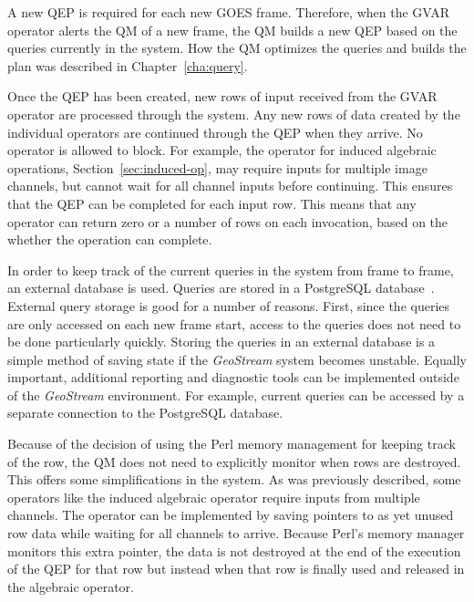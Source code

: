 \documentclass{ucdthesis}       %
\begin{document}
%  

A new \ac{QEP} is required for each new \ac{GOES} frame.  Therefore,
when the \ac{GVAR} operator alerts the \ac{QM} of a new frame, the
\ac{QM} builds a new \ac{QEP} based on the queries currently in the
system.  How the \ac{QM} optimizes the queries and builds the plan was
described in Chapter~\ref{cha:query}.

Once the \ac{QEP} has been created, new rows of input received from
the \ac{GVAR} operator are processed through the system.  Any new rows
of data created by the individual operators are continued through the
\ac{QEP} when they arrive.  No operator is allowed to block.  For
example, the operator for induced algebraic operations,
Section~\ref{sec:induced-op}, may require inputs for multiple image
channels, but cannot wait for all channel inputs before continuing.
This ensures that the \ac{QEP} can be completed for each input row.
This means that any operator can return zero or a number of rows on
each invocation, based on the whether the operation can complete.

In order to keep track of the current queries in the system from frame
to frame, an external database is used.  Queries are stored in a
PostgreSQL database~\cite{05postg}.  External query storage is
good for a number of reasons.  First, since the queries are only
accessed on each new frame start, access to the queries does not need
to be done particularly quickly.  Storing the queries in an external
database is a simple method of saving state if the \emph{GeoStream}
system becomes unstable.  Equally important, additional reporting and
diagnostic tools can be implemented outside of the \emph{GeoStream}
environment.  For example, current queries can be accessed by a
separate connection to the PostgreSQL database.

Because of the decision of using the Perl memory management for
keeping track of the row, the \ac{QM} does not need to explicitly
monitor when rows are destroyed.  This offers some simplifications in
the system.  As was previously described, some operators like the
induced algebraic operator require inputs from multiple channels.  The
operator can be implemented by saving pointers to as yet unused row
data while waiting for all channels to arrive.  Because Perl's memory
manager monitors this extra pointer, the data is not destroyed at the
end of the execution of the \ac{QEP} for that row but instead when
that row is finally used and released in the algebraic operator.
\end{document}
